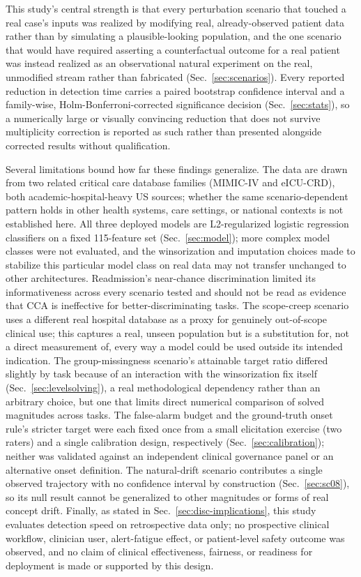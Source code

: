 \documentclass[apajournal,article,submit,oneauthor]{Definitions/mdpi}
\begin{document}
This study's central strength is that every perturbation scenario that touched a real case's inputs was realized by modifying real, already-observed patient data rather than by simulating a plausible-looking population, and the one scenario that would have required asserting a counterfactual outcome for a real patient was instead realized as an observational natural experiment on the real, unmodified stream rather than fabricated (Sec.~\ref{sec:scenarios}). Every reported reduction in detection time carries a paired bootstrap confidence interval and a family-wise, Holm-Bonferroni-corrected significance decision (Sec.~\ref{sec:stats}), so a numerically large or visually convincing reduction that does not survive multiplicity correction is reported as such rather than presented alongside corrected results without qualification.

Several limitations bound how far these findings generalize. The data are drawn from two related critical care database families (MIMIC-IV and eICU-CRD), both academic-hospital-heavy US sources; whether the same scenario-dependent pattern holds in other health systems, care settings, or national contexts is not established here. All three deployed models are L2-regularized logistic regression classifiers on a fixed 115-feature set (Sec.~\ref{sec:model}); more complex model classes were not evaluated, and the winsorization and imputation choices made to stabilize this particular model class on real data may not transfer unchanged to other architectures. Readmission's near-chance discrimination limited its informativeness across every scenario tested and should not be read as evidence that CCA is ineffective for better-discriminating tasks. The scope-creep scenario uses a different real hospital database as a proxy for genuinely out-of-scope clinical use; this captures a real, unseen population but is a substitution for, not a direct measurement of, every way a model could be used outside its intended indication. The group-missingness scenario's attainable target ratio differed slightly by task because of an interaction with the winsorization fix itself (Sec.~\ref{sec:levelsolving}), a real methodological dependency rather than an arbitrary choice, but one that limits direct numerical comparison of solved magnitudes across tasks. The false-alarm budget and the ground-truth onset rule's stricter target were each fixed once from a small elicitation exercise (two raters) and a single calibration design, respectively (Sec.~\ref{sec:calibration}); neither was validated against an independent clinical governance panel or an alternative onset definition. The natural-drift scenario contributes a single observed trajectory with no confidence interval by construction (Sec.~\ref{sec:sc08}), so its null result cannot be generalized to other magnitudes or forms of real concept drift. Finally, as stated in Sec.~\ref{sec:disc-implications}, this study evaluates detection speed on retrospective data only; no prospective clinical workflow, clinician user, alert-fatigue effect, or patient-level safety outcome was observed, and no claim of clinical effectiveness, fairness, or readiness for deployment is made or supported by this design.
\end{document}
